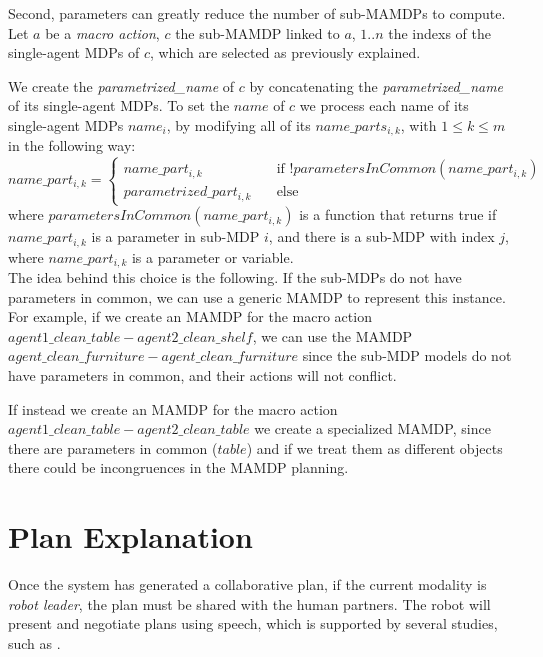 Second, parameters can greatly  reduce the number of sub-MAMDPs to compute. Let $a$ be a \textit{macro action}, $c$ the sub-MAMDP linked to $a$, $1..n$ the indexs of the single-agent MDPs of $c$, which are selected as previously explained.

 We create the \textit{parametrized\_name} of $c$ by concatenating the \textit{parametrized\_name} of its single-agent MDPs. To set the $name$ of  $c$ we process each name of its single-agent MDPs $name_i$, by modifying all of its $name\_parts_{i,k}$, with $1 \leq k \leq m$ in the following way:\\
$name\_part_{i,k}=
\begin{cases}
	name\_part_{i,k} & \quad \text{if } !parametersInCommon(name\_part_{i,k}) \\
	parametrized\_part_{i,k} & \quad \text{else}
\end{cases}$ \\
where $parametersInCommon(name\_part_{i,k})$ is a function that returns true if $name\_part_{i,k}$ is a parameter in sub-MDP $i$, and there is a sub-MDP with index $j$, where $name\_part_{i,k}$ is a parameter or variable. \\

The idea behind this choice is the following. If the sub-MDPs do not have parameters in common, we can use a generic MAMDP to represent this instance. For example, if we create an MAMDP for the macro action $agent1\_clean\_table-agent2\_clean\_shelf$, we can use the MAMDP $agent\_clean\_furniture-agent\_clean\_furniture$ since the sub-MDP models do not have parameters in common, and their actions will not conflict.

 If instead we create an MAMDP for the macro action $agent1\_clean\_table-agent2\_clean\_table$ we create a specialized MAMDP, since there are parameters in common ($table$) and if we treat them as different objects there could be incongruences in the MAMDP planning.

\section{Plan Explanation}
\label{sec:plan_management-plan_explanation}
Once the system has generated a collaborative plan, if the current modality is \textit{robot leader}, the plan must be shared with the human partners. The robot will present and negotiate plans using speech, which is supported by several studies, such as \cite{Lallee2013,tomasello2005}.

